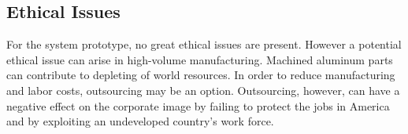 \subsection*{Ethical Issues}
For the system prototype, no great ethical issues are present. However a potential ethical issue can arise in high-volume manufacturing. Machined aluminum parts can contribute to depleting of world resources. In order to reduce manufacturing and labor costs, outsourcing may be an option. Outsourcing, however, can have a negative effect on the corporate image by failing to protect the jobs in America and by exploiting an undeveloped country's work force.